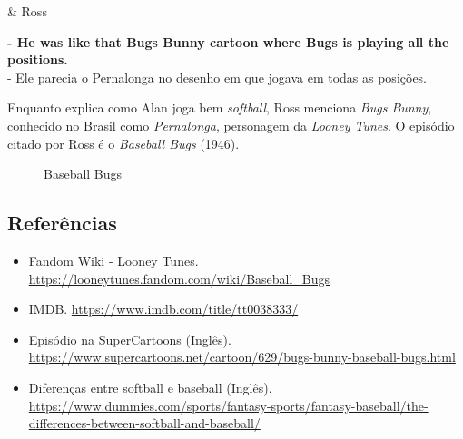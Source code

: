 \begin{tcolorbox}[enhanced,center upper,
    drop fuzzy shadow southeast, boxrule=0.3pt,
    lower separated=false, breakable,
    colframe=black!30!dialogoBorder,colback=white]
\begin{minipage}[c]{0.16\linewidth}
   & \centering \scriptsize{Ross}
\end{minipage}
\hfill
\begin{minipage}[c]{0.8\linewidth}
  \textbf{- He was like that Bugs Bunny cartoon where Bugs is playing all the positions.}\\
  - Ele parecia o Pernalonga no desenho em que jogava em todas as posições.
\end{minipage}
\end{tcolorbox}

Enquanto explica como Alan joga bem \emph{softball}, Ross menciona
\emph{Bugs Bunny}, conhecido no Brasil como \emph{Pernalonga},
personagem da \emph{Looney Tunes}. O episódio citado por Ross é o
\emph{Baseball Bugs} (1946).

\begin{figure}
  \centering
    \caption{Baseball Bugs\label{fig:baseball-bugs}}
\end{figure}

\hypertarget{referuxeancias-4}{%
\subsection{Referências}\label{referuxeancias-4}}

\begin{itemize}
\tightlist
\item
  \sloppy Fandom Wiki - Looney Tunes. \url{https://looneytunes.fandom.com/wiki/Baseball_Bugs}
\item
  \sloppy IMDB. \url{https://www.imdb.com/title/tt0038333/}
\item
  \sloppy Episódio na SuperCartoons (Inglês). \url{https://www.supercartoons.net/cartoon/629/bugs-bunny-baseball-bugs.html}
\item
  \sloppy Diferenças entre softball e baseball (Inglês). \url{https://www.dummies.com/sports/fantasy-sports/fantasy-baseball/the-differences-between-softball-and-baseball/}
\end{itemize}

